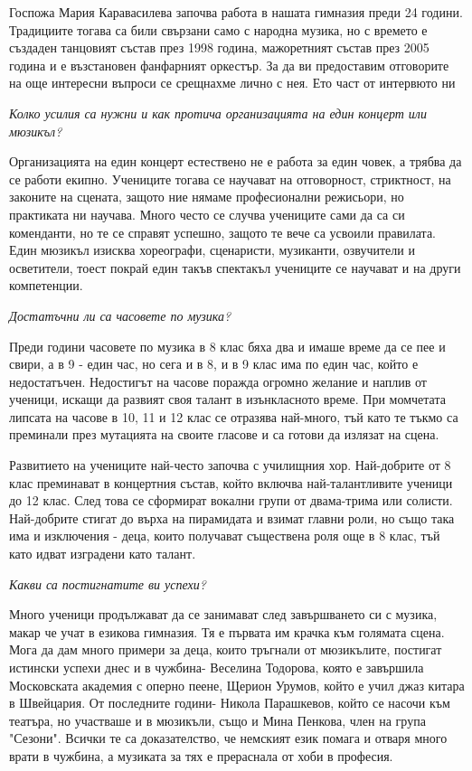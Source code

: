 \begin{multicols}{3}

Госпожа Мария Каравасилева започва работа в нашата гимназия преди 24 години. Традициите тогава са били свързани само с народна музика, но с времето е създаден танцовият състав през 1998 година, мажоретният състав през 2005 година и е възстановен фанфарният оркестър. За да ви предоставим отговорите на още интересни въпроси се срещнахме лично с нея. Ето част от интервюто ни

\textit{Колко усилия са нужни и как протича организацията на един концерт или мюзикъл?}

Организацията на един концерт естествено не е работа за един човек, а трябва да се работи екипно. Учениците тогава се научават на отговорност, стриктност, на законите на сцената, защото ние нямаме професионални режисьори, но практиката ни научава. Много често се случва учениците сами да са си коменданти, но те се справят успешно, защото те вече са усвоили правилата. Един мюзикъл изисква хореографи, сценаристи, музиканти, озвучители и осветители, тоест покрай един такъв спектакъл учениците се научават и на други компетенции.

\textit{Достатъчни ли са часовете по музика?}

Преди години часовете по музика в 8 клас бяха два и имаше време да се пее и свири, а в 9 - един час, но сега и в 8, и в 9 клас има по един час, който е недостатъчен. Недостигът на часове поражда огромно желание и наплив от ученици, искащи да развият своя талант в изънкласното време. При момчетата липсата на часове в 10, 11 и 12 клас се отразява най-много, тъй като те тъкмо са преминали през мутацията на своите гласове и са готови да излязат на сцена.

Развитието на учениците най-често започва с училищния хор. Най-добрите от 8 клас преминават в концертния състав, който включва най-талантливите ученици  до 12 клас. След това се сформират вокални групи от двама-трима или солисти. Най-добрите стигат до върха на пирамидата и взимат главни роли, но също така има и изключения - деца, които получават съществена роля още в 8 клас, тъй като идват изградени като талант.

\textit{Какви са постигнатите ви успехи?}

Много ученици продължават да се занимават след завършването си с музика, макар че учат в езикова гимназия. Тя е първата им крачка към голямата сцена. Мога да дам много примери за деца, които тръгнали от мюзикълите, постигат истински успехи днес и в чужбина- Веселина Тодорова, която е завършила Московската академия с оперно пеене, Щерион Урумов, който е учил джаз китара в Швейцария. От последните години- Никола Парашкевов, който се насочи към театъра, но участваше и в мюзикъли, също и Мина Пенкова, член на група "Сезони". Всички те са доказателство, че немският език помага и отваря много врати в чужбина, а музиката за тях е прераснала от хоби в професия.
\closearticle
\end{multicols}